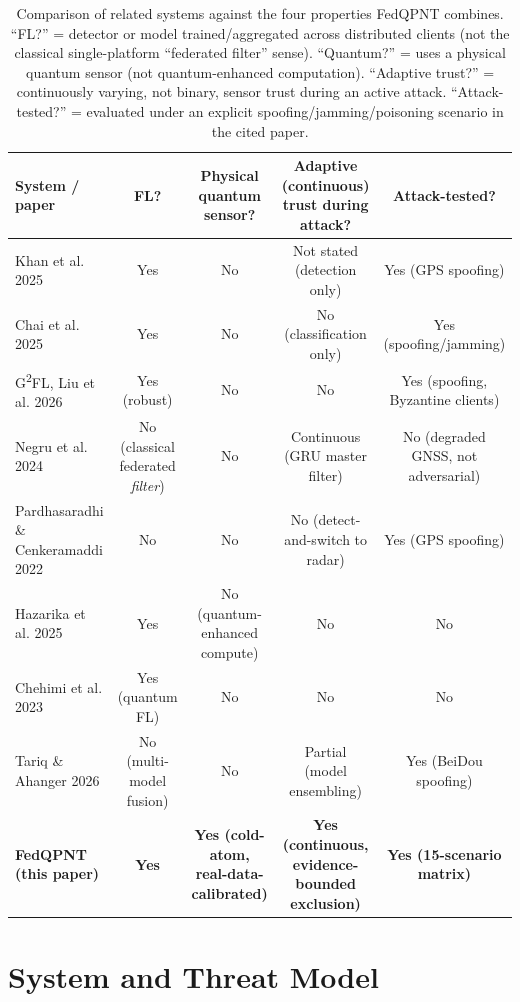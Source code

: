 \documentclass[journal]{IEEEtran}
\begin{document}
\begin{table}[t]
\centering
\caption{Comparison of related systems against the four properties FedQPNT combines. ``FL?'' = detector or model trained/aggregated across distributed clients (not the classical single-platform ``federated filter'' sense). ``Quantum?'' = uses a physical quantum sensor (not quantum-enhanced computation). ``Adaptive trust?'' = continuously varying, not binary, sensor trust during an active attack. ``Attack-tested?'' = evaluated under an explicit spoofing/jamming/poisoning scenario in the cited paper.}
\label{tab:comparison}
\begin{tabular}{lcccc}
\toprule
System / paper & FL? & Physical quantum sensor? & Adaptive (continuous) trust during attack? & Attack-tested? \\
\midrule
Khan et al. 2025 \cite{khan2025enhancing} & Yes & No & Not stated (detection only) & Yes (GPS spoofing) \\
Chai et al. 2025 \cite{chai2025navigation} & Yes & No & No (classification only) & Yes (spoofing/jamming) \\
G\textsuperscript{2}FL, Liu et al. 2026 \cite{liu2026g2fl} & Yes (robust) & No & No & Yes (spoofing, Byzantine clients) \\
Negru et al. 2024 \cite{negru2024resilient} & No (classical federated \emph{filter}) & No & Continuous (GRU master filter) & No (degraded GNSS, not adversarial) \\
Pardhasaradhi \& Cenkeramaddi 2022 \cite{pardhasaradhi2022gps} & No & No & No (detect-and-switch to radar) & Yes (GPS spoofing) \\
Hazarika et al. 2025 \cite{hazarika2025quantum} & Yes & No (quantum-enhanced compute) & No & No \\
Chehimi et al. 2023 \cite{chehimi2023foundations} & Yes (quantum FL) & No & No & No \\
Tariq \& Ahanger 2026 \cite{tariq2026multimodel} & No (multi-model fusion) & No & Partial (model ensembling) & Yes (BeiDou spoofing) \\
\textbf{FedQPNT (this paper)} & \textbf{Yes} & \textbf{Yes (cold-atom, real-data-calibrated)} & \textbf{Yes (continuous, evidence-bounded exclusion)} & \textbf{Yes (15-scenario matrix)} \\
\bottomrule
\end{tabular}
\end{table}

\section{System and Threat Model}
\label{sec:threat}
\end{document}
